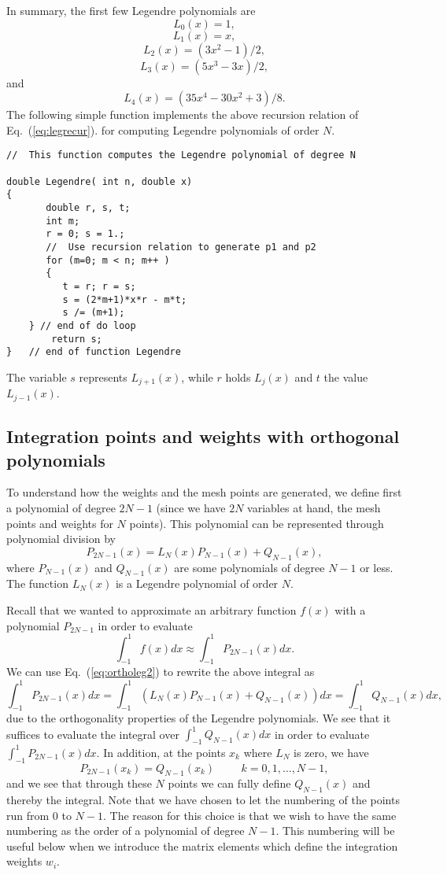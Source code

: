 In summary, the first few Legendre polynomials are
\[
   L_0(x) =1,
\]
\[
  L_1(x) = x,
\]
\[
  L_2(x) = (3x^2-1)/2,
\]
\[
   L_3(x) = (5x^3-3x)/2,
\]
and 
\[
   L_4(x) = (35x^4-30x^2+3)/8.
\]
The following simple function implements the above recursion relation
of Eq.~(\ref{eq:legrecur}).
for computing Legendre polynomials of order $N$.
\lstset{language=c++}
\begin{lstlisting}
//  This function computes the Legendre polynomial of degree N

double Legendre( int n, double x) 
{
       double r, s, t;
       int m;
       r = 0; s = 1.;
       //  Use recursion relation to generate p1 and p2
       for (m=0; m < n; m++ )  
       {
          t = r; r = s; 
          s = (2*m+1)*x*r - m*t;
          s /= (m+1);
	} // end of do loop 
        return s;
}   // end of function Legendre
\end{lstlisting}
The variable $s$ represents $L_{j+1}(x)$, while $r$ holds
$L_j(x)$ and $t$ the value $L_{j-1}(x)$.

\subsection{Integration points and weights with orthogonal polynomials}


To understand how the weights and the mesh points are generated, we define first
a polynomial of degree $2N-1$ (since we have $2N$ variables at hand, the mesh points
and weights for $N$ points). This polynomial can be represented through polynomial
division by
\[
   P_{2N-1}(x)=L_N(x)P_{N-1}(x)+Q_{N-1}(x),
\]
where $P_{N-1}(x)$ and $Q_{N-1}(x)$ are some polynomials of degree $N-1$ or less.
The function $L_N(x)$ is a Legendre polynomial of order $N$. 

Recall that we wanted to approximate  an arbitrary function $f(x)$ with a
polynomial $P_{2N-1}$ in order to evaluate 
\[
   \int_{-1}^1f(x)dx\approx \int_{-1}^1P_{2N-1}(x)dx.
\]
We can use Eq.~(\ref{eq:ortholeg2})
to rewrite the above integral as
\[ 
   \int_{-1}^1P_{2N-1}(x)dx=\int_{-1}^1(L_N(x)P_{N-1}(x)+Q_{N-1}(x))dx=\int_{-1}^1Q_{N-1}(x)dx,
\]
due to the orthogonality properties of the Legendre polynomials. We see that it suffices
to evaluate the integral over $\int_{-1}^1Q_{N-1}(x)dx$ in order to evaluate 
$\int_{-1}^1P_{2N-1}(x)dx$. In addition, at the points $x_k$ where $L_N$ is zero, we have
\[
    P_{2N-1}(x_k)=Q_{N-1}(x_k)\hspace{1cm} k=0,1,\dots, N-1,
\]
and we see that through these $N$ points we can fully define $Q_{N-1}(x)$  and thereby the 
integral. Note that we have chosen to let the numbering of the points run from $0$ to $N-1$.
The reason for this choice is that we wish to have the same numbering as the order of a 
polynomial of degree $N-1$.  This numbering will be useful below when  we introduce the matrix
elements  which define the integration weights $w_i$.

